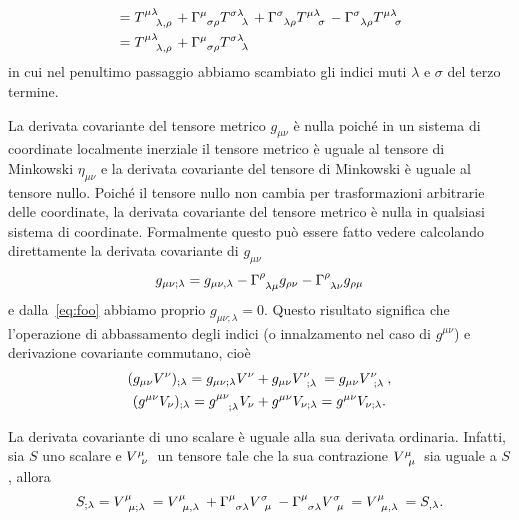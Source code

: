 \begin{enumerate}
\begin{equation}
\begin{split}
      &= \tensor{T}{^{\mu\lambda}_{\lambda,\rho}} +
      \tensor{\Gamma}{^{\mu}_{\sigma\rho}}\tensor{T}{^{\sigma\lambda}_{\lambda}}
      + \tensor{\Gamma}{^{\sigma}_{\lambda\rho}}
      \tensor{T}{^{\mu\lambda}_{\sigma}} -
      \tensor{\Gamma}{^{\sigma}_{\lambda\rho}}
      \tensor{T}{^{\mu\lambda}_{\sigma}} \\
      &= \tensor{T}{^{\mu\lambda}_{\lambda,\rho}} +
      \tensor{\Gamma}{^{\mu}_{\sigma\rho}}\tensor{T}{^{\sigma\lambda}_{\lambda}}
    \end{split}
  \end{equation}
  in cui nel penultimo passaggio abbiamo scambiato gli indici muti $\lambda$ e
  $\sigma$ del terzo termine.
\end{enumerate}

La derivata covariante del tensore metrico $g_{\mu\nu}$ è nulla poiché in un
sistema di coordinate localmente inerziale il tensore metrico è uguale al
tensore di Minkowski $\eta_{\mu\nu}$ e la derivata covariante del tensore di
Minkowski è uguale al tensore nullo.  Poiché il tensore nullo non cambia per
trasformazioni arbitrarie delle coordinate, la derivata covariante del tensore
metrico è nulla in qualsiasi sistema di coordinate.  Formalmente questo può
essere fatto vedere calcolando direttamente la derivata covariante di
$g_{\mu\nu}$
\begin{equation}
  g_{\mu\nu;\lambda} = g_{\mu\nu,\lambda} -
  \tensor{\Gamma}{^{\rho}_{\lambda\mu}}g_{\rho\nu} -
  \tensor{\Gamma}{^{\rho}_{\lambda\nu}}g_{\rho\mu}
\end{equation}
e dalla~\eqref{eq:foo} abbiamo proprio $g_{\mu\nu;\lambda} = 0$.  Questo
risultato significa che l'operazione di abbassamento degli indici (o
innalzamento nel caso di $g^{\mu\nu}$) e derivazione covariante commutano, cioè
\begin{subequations}
  \begin{gather}
    (g_{\mu\nu}V^{\nu})_{;\lambda} = g_{\mu\nu;\lambda}V^{\nu} +
    g_{\mu\nu}\tensor{V}{^{\nu}_{;\lambda}} =
    g_{\mu\nu}\tensor{V}{^{\nu}_{;\lambda}}, \\
    (g^{\mu\nu}V_{\nu})_{;\lambda} = \tensor{g}{^{\mu\nu}_{;\lambda}}V_{\nu} +
    g^{\mu\nu}V_{\nu;\lambda} = g^{\mu\nu}V_{\nu;\lambda}.
  \end{gather}
\end{subequations}

La derivata covariante di uno scalare è uguale alla sua derivata ordinaria.
Infatti, sia $S$ uno scalare e $\tensor{V}{^{\mu}_{\nu}}$ un tensore tale che la
sua contrazione $\tensor{V}{^{\mu}_{\mu}}$ sia uguale a $S$, allora
\begin{equation}
  S_{;\lambda} = \tensor{V}{^{\mu}_{\mu;\lambda}} =
  \tensor{V}{^{\mu}_{\mu,\lambda}} + \tensor{\Gamma}{^{\mu}_{\sigma\lambda}}
  \tensor{V}{^{\sigma}_{\mu}} - \tensor{\Gamma}{^{\mu}_{\sigma\lambda}}
  \tensor{V}{^{\sigma}_{\mu}} = \tensor{V}{^{\mu}_{\mu,\lambda}} = S_{,\lambda}.
\end{equation}

